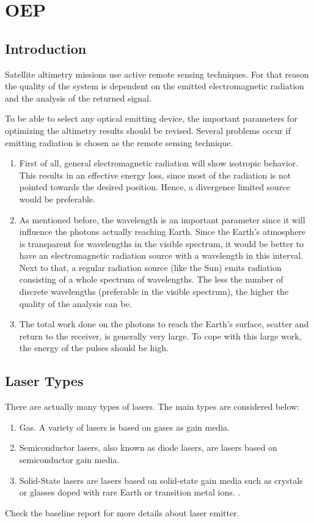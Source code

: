 \section{\acl{OEP}}
\label{designOptionsEmitter}
\subsection{Introduction}
Satellite altimetry missions use active remote sensing techniques. For that reason the quality of the system is dependent on the emitted electromagnetic radiation and the analysis of the returned signal. 

To be able to select any optical emitting device, the important parameters for optimizing the altimetry results should be revised. Several problems occur if emitting radiation is chosen as the remote sensing technique. 
\begin{enumerate}[i]
	\item First of all, general electromagnetic radiation will show isotropic behavior. This results in an effective energy loss, since most of the radiation is not pointed towards the desired position. Hence, a divergence limited source would be preferable.
	\item As mentioned before, the wavelength is an important parameter since it will influence the photons actually reaching Earth. Since the Earth's atmosphere is transparent for wavelengths in the visible spectrum, it would be better to have an electromagnetic radiation source with a wavelength in this interval. Next to that, a regular radiation source (like the Sun) emits radiation consisting of a whole spectrum of wavelengths. The less the number of discrete wavelengths (preferable in the visible spectrum), the higher the quality of the analysis can be.
	\item The total work done on the photons to reach the Earth's surface, scatter and return to the receiver, is generally very large. To cope with this large work, the energy of the pulses should be high.  
\end{enumerate}

\subsection{Laser Types}
	\label{blDOLSRtypes}
There are actually many types of \acs{laser}s. The main types are considered below:
\begin{enumerate}
	\item Gas. A variety of \acs{laser}s is based on gases as gain media. 
	\item Semiconductor \acs{laser}s, also known as diode \acs{laser}s, are \acs{laser}s based on semiconductor gain media. 
	\item Solid-State \acs{laser}s are \acs{laser}s based on solid-state gain media such as crystals or glasses doped with rare Earth or transition metal ions. . \cite{lasertech}
\end{enumerate} 
Check the baseline report for more details about \acs{laser} emitter.